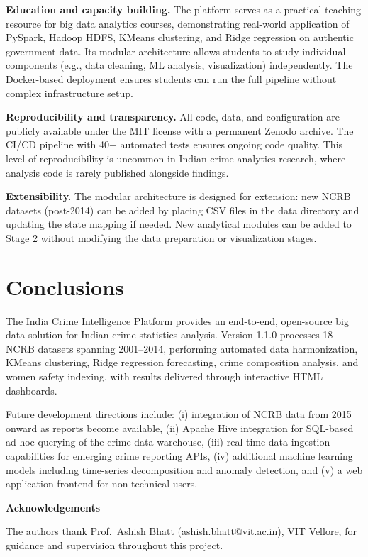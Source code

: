 \documentclass[a4paper,12pt]{article}
\begin{document}
\textbf{Education and capacity building.} The platform serves as a practical teaching resource for big data analytics courses, demonstrating real-world application of PySpark, Hadoop HDFS, KMeans clustering, and Ridge regression on authentic government data. Its modular architecture allows students to study individual components (e.g., data cleaning, ML analysis, visualization) independently. The Docker-based deployment ensures students can run the full pipeline without complex infrastructure setup.

\textbf{Reproducibility and transparency.} All code, data, and configuration are publicly available under the MIT license with a permanent Zenodo archive. The CI/CD pipeline with 40+ automated tests ensures ongoing code quality. This level of reproducibility is uncommon in Indian crime analytics research, where analysis code is rarely published alongside findings.

\textbf{Extensibility.} The modular architecture is designed for extension: new NCRB datasets (post-2014) can be added by placing CSV files in the data directory and updating the state mapping if needed. New analytical modules can be added to Stage 2 without modifying the data preparation or visualization stages.

\section{Conclusions}

The India Crime Intelligence Platform provides an end-to-end, open-source big data solution for Indian crime statistics analysis. Version 1.1.0 processes 18 NCRB datasets spanning 2001--2014, performing automated data harmonization, KMeans clustering, Ridge regression forecasting, crime composition analysis, and women safety indexing, with results delivered through interactive HTML dashboards.

Future development directions include: (i) integration of NCRB data from 2015 onward as reports become available, (ii) Apache Hive integration for SQL-based ad hoc querying of the crime data warehouse, (iii) real-time data ingestion capabilities for emerging crime reporting APIs, (iv) additional machine learning models including time-series decomposition and anomaly detection, and (v) a web application frontend for non-technical users.

\vspace{4pt}
\textbf{Acknowledgements}

The authors thank Prof.\ Ashish Bhatt (\href{mailto:ashish.bhatt@vit.ac.in}{ashish.bhatt@vit.ac.in}), VIT Vellore, for guidance and supervision throughout this project.
\end{document}
